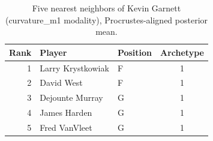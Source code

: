 \begin{table}[htbp]
  \centering\small
  \begin{tabular}{rllc}
    \toprule
    Rank & Player & Position & Archetype \\
    \midrule
    1 & Larry Krystkowiak & F & 1 \\
    2 & David West & F & 1 \\
    3 & Dejounte Murray & G & 1 \\
    4 & James Harden & G & 1 \\
    5 & Fred VanVleet & G & 1 \\
    \bottomrule
  \end{tabular}
  \caption{Five nearest neighbors of Kevin Garnett (curvature_m1 modality), Procrustes-aligned posterior mean.}
  \label{tab:Kevin_Garnett_neighbors_curvature_m1}
\end{table}

